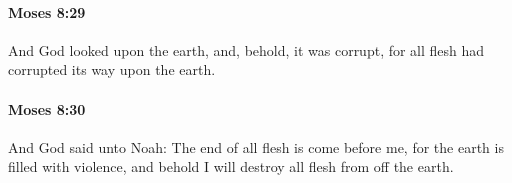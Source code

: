 		\paragraph{Moses 8:29} %
			\label{MOSES-8-29}

			And God looked upon the earth, and, behold, it was corrupt, for all flesh had corrupted its way upon the earth.


		\paragraph{Moses 8:30} %
			\label{MOSES-8-30}

			And God said unto Noah: The end of all flesh is come before me, for the earth is filled with violence, and behold I will destroy all flesh from off the earth.

